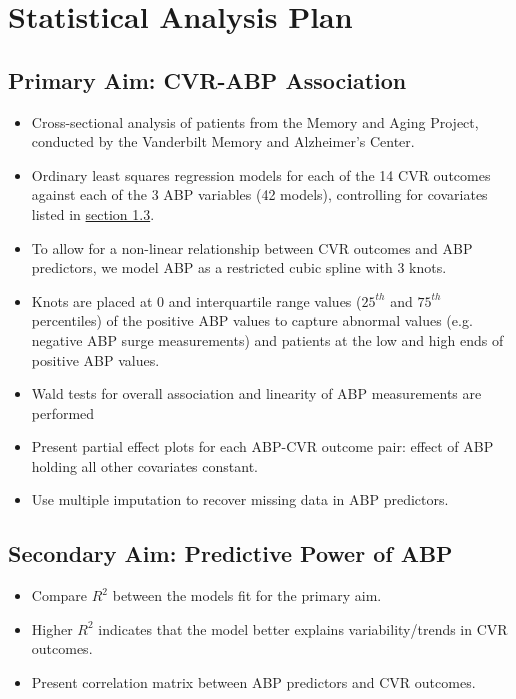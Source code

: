 \documentclass[10pt]{article}\usepackage[]{graphicx}\usepackage[]{color}
\begin{document}
\clearpage

\section{Statistical Analysis Plan}

\subsection{Primary Aim: CVR-ABP Association}

\begin{itemize}
  \item Cross-sectional analysis of patients from the Memory and Aging Project, conducted by the Vanderbilt Memory and Alzheimer's Center.
  \item Ordinary least squares regression models for each of the 14 CVR outcomes against each of the 3 ABP variables (42 models), controlling for covariates listed in \hyperref[sec:vars]{section 1.3}.
  \item To allow for a non-linear relationship between CVR outcomes and ABP predictors, we model ABP as a restricted cubic spline with 3 knots. 
  \item Knots are placed at 0 and interquartile range values ($25^{th}$ and $75^{th}$ percentiles) of the positive ABP values to capture abnormal values (e.g. negative ABP surge measurements) and patients at the low and high ends of positive ABP values.
  \item Wald tests for overall association and linearity of ABP measurements are performed 
  \item Present partial effect plots for each ABP-CVR outcome pair: effect of ABP holding all other covariates constant.
  \item Use multiple imputation to recover missing data in ABP predictors.
\end{itemize}


\subsection{Secondary Aim: Predictive Power of ABP}

\begin{itemize}
  \item Compare $R^2$ between the models fit for the primary aim.
  \item Higher $R^2$ indicates that the model better explains variability/trends in CVR outcomes.
  \item Present correlation matrix between ABP predictors and CVR outcomes.
\end{itemize}
\end{document}
